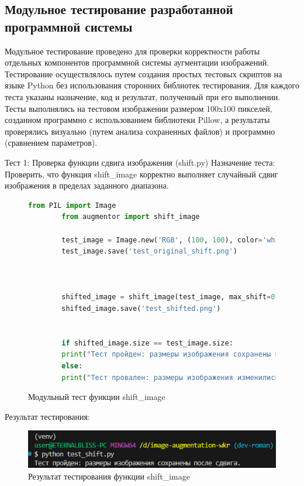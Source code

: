\subsection{Модульное тестирование разработанной программной системы}

Модульное тестирование проведено для проверки корректности работы отдельных компонентов программной системы аугментации изображений. Тестирование осуществлялось путем создания простых тестовых скриптов на языке Python без использования сторонних библиотек тестирования. Для каждого теста указаны назначение, код и результат, полученный при его выполнении. Тесты выполнялись на тестовом изображении размером 100x100 пикселей, созданном программно с использованием библиотеки Pillow, а результаты проверялись визуально (путем анализа сохраненных файлов) и программно (сравнением параметров).


Тест 1: Проверка функции сдвига изображения (shift.py)
Назначение теста: Проверить, что функция shift\_image корректно выполняет случайный сдвиг изображения в пределах заданного диапазона.

\begin{figure}[H]
	\begin{lstlisting}[language=Python]
		from PIL import Image
		from augmentor import shift_image
		
		test_image = Image.new('RGB', (100, 100), color='white')
		test_image.save('test_original_shift.png')
		
		
		
		shifted_image = shift_image(test_image, max_shift=0.2)
		shifted_image.save('test_shifted.png')
		
		
		if shifted_image.size == test_image.size:
		print("Тест пройден: размеры изображения сохранены после сдвига.")
		else:
		print("Тест провален: размеры изображения изменились после сдвига.")
	\end{lstlisting}  
	\caption{Модульный тест функции shift\_image}
	\label{model_test:test1}
\end{figure}

Результат тестирования:
\begin{figure}[H]
	\centering
	\includegraphics[width=0.7\linewidth]{images/resulttest1}
	\caption{Результат тестирования функции shift\_image}
	\label{fig:resulttest1}
\end{figure}

